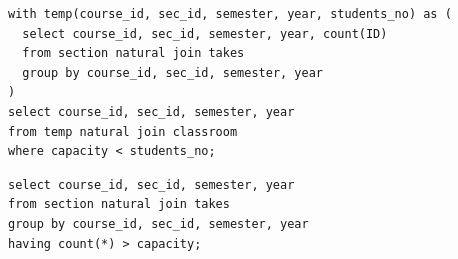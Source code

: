 \documentclass[12pt]{exam}
\begin{document}
\begin{questions}
\begin{choices}
  \choice
\begin{verbatim}
with temp(course_id, sec_id, semester, year, students_no) as (
  select course_id, sec_id, semester, year, count(ID)
  from section natural join takes
  group by course_id, sec_id, semester, year
)
select course_id, sec_id, semester, year
from temp natural join classroom
where capacity < students_no;
\end{verbatim}

  \choice
\begin{verbatim}
select course_id, sec_id, semester, year
from section natural join takes
group by course_id, sec_id, semester, year
having count(*) > capacity;
\end{verbatim}

\end{choices}

\end{questions}
\end{document}
